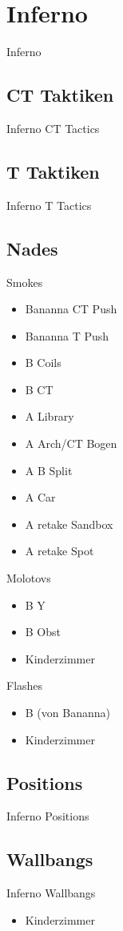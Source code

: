 \newpage




\chapter{Inferno}
\label{chap:inferno}
Inferno

\section{CT Taktiken}
\label{sect:inferno_ct}
Inferno CT Tactics

\section{T Taktiken}
\label{sect:inferno_t}
Inferno T Tactics

\section{Nades}
\label{sect:inferno_nades}
Smokes
\begin{itemize}
\item Bananna CT Push
\item Bananna T Push
\item B Coils
\item B CT
\item A Library
\item A Arch/CT Bogen
\item A B Split
\item A Car
\item A retake Sandbox
\item A retake Spot
\end{itemize}

Molotovs
\begin{itemize}
\item B Y
\item B Obst
\item Kinderzimmer
\end{itemize}

Flashes
\begin{itemize}
\item B (von Bananna)
\item Kinderzimmer
\end{itemize}

\section{Positions}
\label{sect:inferno_positions}
Inferno Positions

\section{Wallbangs}
\label{sect:inferno_wallbangs}
Inferno Wallbangs
\begin{itemize}
\item Kinderzimmer
\end{itemize}